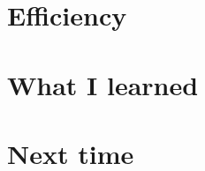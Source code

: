 \documentclass[a4paper,12pt]{article}
\begin{document}

\section{Efficiency}


\section{What I learned}


\section{Next time}

\end{document}
